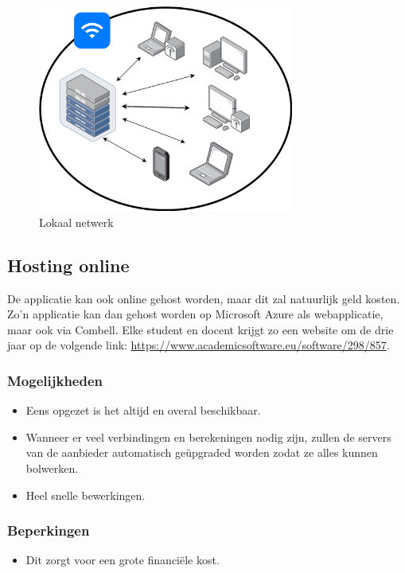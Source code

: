 \begin{figure}
    \centering
    \includegraphics[width=0.75\textwidth]{./img/lokaal_netwerk}
    \caption{\label{fig:lokaal_netwerk} Lokaal netwerk}
\end{figure}

\subsection{Hosting online}
De applicatie kan ook online gehost worden, maar dit zal natuurlijk geld kosten. Zo'n applicatie kan dan gehost worden op Microsoft Azure als webapplicatie, maar ook via Combell. Elke student en docent krijgt zo een website om de drie jaar op de volgende link: \url{https://www.academicsoftware.eu/software/298/857}.
\subsubsection{Mogelijkheden}
\begin{itemize}
    \item Eens opgezet is het altijd en overal beschikbaar.
    \item Wanneer er veel verbindingen en berekeningen nodig zijn, zullen de servers van de aanbieder automatisch geüpgraded worden zodat ze alles kunnen bolwerken.
    \item Heel snelle bewerkingen.
\end{itemize}
\subsubsection{Beperkingen}
\begin{itemize}
    \item Dit zorgt voor een grote financiële kost.
\end{itemize}

